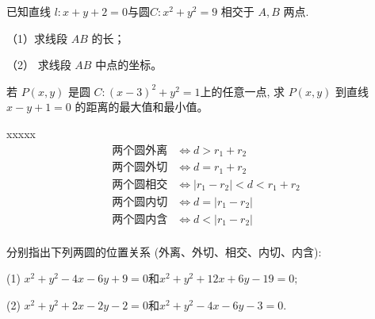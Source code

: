 \begin{example}
    已知直线 $ l: x+y+2=0  $与圆$  C: x^{2}+y^{2}=9$  相交于 $ A, B$  两点.

    （1）求线段 $ A B $ 的长；

    （2） 求线段  $A B $ 中点的坐标。
\end{example}

\begin{example}
    若  $P(x, y) $ 是圆 $ C:(x-3)^{2}+y^{2}=1  $上的任意一点, 求 $ P(x, y) $ 到直线 $ x-y+1=0 $ 的距离的最大值和最小值。
\end{example}

\begin{definition}
    
\end{definition}
\begin{theorem}
xxxxx
\vspace*{-0.3cm}
    \begin{align*}
        \text{两个圆外离} & \Leftrightarrow d > r_{1} + r_{2} \\
        \text{两个圆外切} & \Leftrightarrow d = r_{1} + r_{2} \\
        \text{两个圆相交} & \Leftrightarrow \left| r_{1} - r_{2} \right| < d < r_{1} + r_{2} \\
        \text{两个圆内切} & \Leftrightarrow d = \left| r_{1} - r_{2} \right| \\
        \text{两个圆内含} & \Leftrightarrow d < \left| r_{1} - r_{2} \right| \\
    \end{align*}
    \vspace*{-1.4cm}
\end{theorem}
\begin{exercise}
    分别指出下列两圆的位置关系 (外离、外切、相交、内切、内含):

(1) $ x^{2}+y^{2}-4 x-6 y+9=0 \text{和}   x^{2}+y^{2}+12 x+6 y-19=0 ;$

(2) $ x^{2}+y^{2}+2 x-2 y-2=0 \text{和}  x^{2}+y^{2}-4 x-6 y-3=0 .$
\end{exercise}

